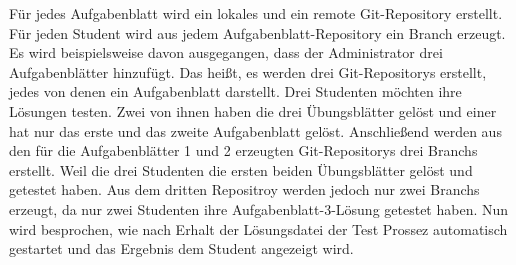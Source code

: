 \documentclass[a4paper,12pt,oneside]{book}
\begin{document}
Für jedes Aufgabenblatt wird ein lokales und ein remote Git-Repository erstellt. Für jeden Student wird aus jedem Aufgabenblatt-Repository ein Branch erzeugt. 
\newline
Es wird beispielsweise davon ausgegangen, dass der Administrator drei Aufgabenblätter hinzufügt. Das heißt, es werden drei Git-Repositorys erstellt, jedes von denen ein Aufgabenblatt darstellt. Drei Studenten möchten ihre Lösungen testen. Zwei von ihnen haben die drei Übungsblätter gelöst und einer hat nur das erste und das zweite Aufgabenblatt gelöst. Anschließend werden aus den für die Aufgabenblätter 1 und 2 erzeugten Git-Repositorys drei Branchs erstellt. Weil die drei Studenten die ersten beiden Übungsblätter gelöst und getestet haben. Aus dem dritten Repositroy werden jedoch nur zwei Branchs erzeugt, da nur zwei Studenten ihre Aufgabenblatt-3-Lösung getestet haben.
\newline
Nun wird besprochen, wie nach Erhalt der Lösungsdatei der Test Prossez automatisch gestartet und das Ergebnis dem Student angezeigt wird.
\end{document}
